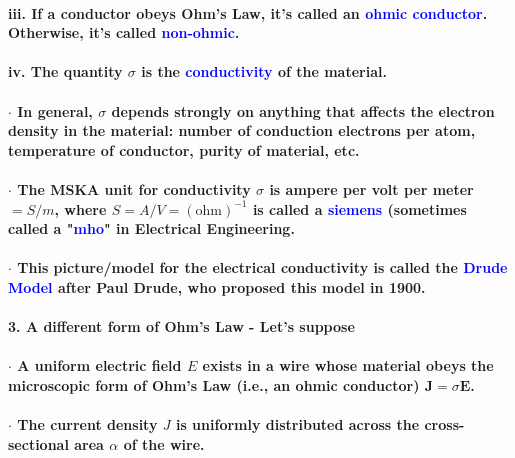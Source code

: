 \documentclass{article}
\begin{document}
\paragraph{\indent\indent iii. If a conductor obeys Ohm's Law, it's called an \textcolor{blue}{ohmic conductor}. Otherwise, it's called \textcolor{blue}{non-ohmic}.}
\paragraph{\indent\indent iv. The quantity $\sigma$ is the \textcolor{blue}{conductivity} of the material.}
\paragraph{\indent\indent $\cdot$ In general, $\sigma$ depends strongly on anything that affects the electron density in the material: number of conduction electrons per atom, temperature of conductor, purity of material, etc.}
\paragraph{\indent\indent $\cdot$ The MSKA unit for conductivity $\sigma$ is ampere per volt per meter $=S/m$, where $S=A/V=(\text{ohm})^{-1}$ is called a \textcolor{blue}{siemens} (sometimes called a "\textcolor{blue}{mho}" in Electrical Engineering.}
\paragraph{\indent\indent $\cdot$ This picture/model for the electrical conductivity is called the \textcolor{blue}{Drude Model} after Paul Drude, who proposed this model in 1900.}
\paragraph{3. A different form of Ohm's Law - Let's suppose}
\paragraph{\indent $\cdot$ A uniform electric field $E$ exists in a wire whose material obeys the microscopic form of Ohm's Law (i.e., an ohmic conductor) $\boldsymbol{J}=\sigma\boldsymbol{E}$.}
\paragraph{\indent $\cdot$ The current density $J$ is uniformly distributed across the cross-sectional area $\alpha$ of the wire.}
\end{document}
